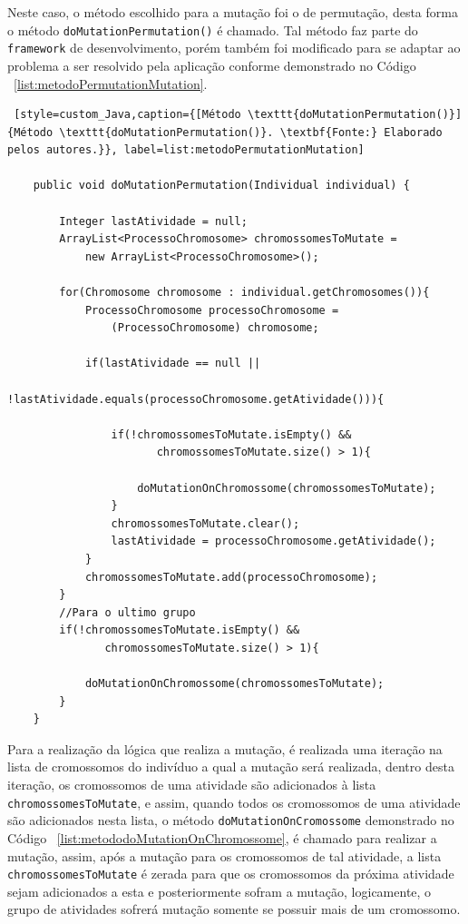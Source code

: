 \par Neste caso, o método escolhido para a mutação foi o de permutação, desta forma o método \texttt{doMutationPermutation()} é chamado.
Tal método faz parte do \texttt{framework} de desenvolvimento, porém também foi modificado para se adaptar ao problema a ser resolvido pela 
aplicação conforme demonstrado no Código ~\ref{list:metodoPermutationMutation}.


\begin{lstlisting} [style=custom_Java,caption={[Método \texttt{doMutationPermutation()}]{Método \texttt{doMutationPermutation()}. \textbf{Fonte:} Elaborado pelos autores.}}, label=list:metodoPermutationMutation] 

	public void doMutationPermutation(Individual individual) {
	
		Integer lastAtividade = null;
		ArrayList<ProcessoChromosome> chromossomesToMutate = 
			new ArrayList<ProcessoChromosome>(); 
		
		for(Chromosome chromosome : individual.getChromosomes()){
			ProcessoChromosome processoChromosome = 
				(ProcessoChromosome) chromosome;
			
			if(lastAtividade == null || 
				   !lastAtividade.equals(processoChromosome.getAtividade())){
				   
				if(!chromossomesToMutate.isEmpty() && 
					   chromossomesToMutate.size() > 1){
					
					doMutationOnChromossome(chromossomesToMutate);
				}
				chromossomesToMutate.clear();
				lastAtividade = processoChromosome.getAtividade();
			}
			chromossomesToMutate.add(processoChromosome);
		}
		//Para o ultimo grupo
		if(!chromossomesToMutate.isEmpty() && 
			   chromossomesToMutate.size() > 1){
			
			doMutationOnChromossome(chromossomesToMutate);
		}
	}

\end{lstlisting}

\par Para a realização da lógica que realiza a mutação, é realizada uma iteração na lista de cromossomos do 
indivíduo a qual a mutação será realizada, dentro desta iteração, os cromossomos de uma atividade são adicionados
à lista \texttt{chromossomesToMutate}, e assim, quando todos os cromossomos de uma atividade são adicionados nesta
lista, o método \texttt{doMutationOnCromossome} demonstrado no Código ~\ref{list:metododoMutationOnChromossome}, é
chamado para realizar a mutação, assim, após a mutação para os cromossomos de tal atividade, a lista \texttt{chromossomesToMutate} é zerada para que os cromossomos da próxima atividade sejam adicionados a esta e posteriormente sofram a mutação, logicamente, o grupo de atividades sofrerá mutação somente se possuir mais de um cromossomo.

